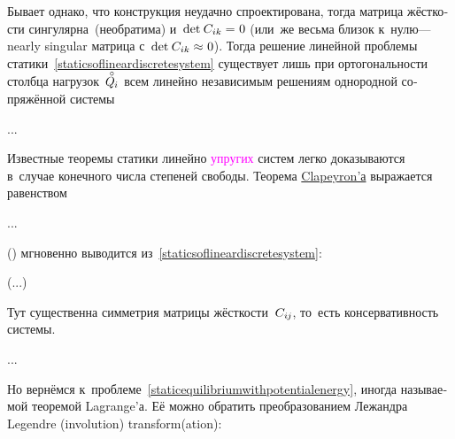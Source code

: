 \begin{otherlanguage}{russian}
\vspace{-0.1em}
Бывает однако, что конструкция неудачно спроектирована, тогда матрица жёсткости сингулярна~(необратима) %
и~${\operatorname{det} \hspace{.16ex} C_{ik} = \hspace{.1ex} 0}$ (или~же весьма близок к~нулю\:--- nearly singular матрица с~${\operatorname{det} \hspace{.16ex} C_{ik} \approx \hspace{.1ex} 0}$).
Тогда решение линейной проблемы статики~\eqref{staticsoflineardiscretesystem} существует лишь при ортогональности столбца нагрузок~${\mathcircabove{Q}_{\hspace{-0.1ex}i}}$ всем линейно независимым решениям однородной сопряжённой системы

...

Известные теоремы статики линейно \textcolor{magenta}{упругих} систем легко доказываются в~случае конечного числа степеней свободы. Теорема \href{https://en.wikipedia.org/wiki/Beno%C3%AEt_Paul_%C3%89mile_Clapeyron}{Clapeyron’а} выражается равенством

...

 () мгновенно выводится из~\eqref{staticsoflineardiscretesystem}:

(...)

\noindent Тут существенна симметрия матрицы жёсткости~$C_{i\hspace{-0.1ex}j}$, то~есть консервативность системы.

...

Но вернёмся к~проблеме~\eqref{staticequilibriumwithpotentialenergy}, иногда называемой теоремой Lagrange’а.
Её можно обратить преобразованием Лежандра Legendre (involution) transform(ation):


\end{otherlanguage}
